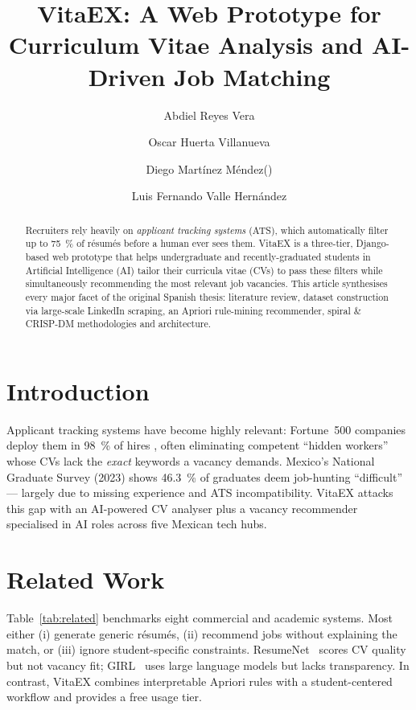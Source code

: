 \documentclass[runningheads]{llncs}
\title{VitaEX: A Web Prototype for Curriculum Vitae Analysis and AI-Driven Job Matching}
\author{
	Abdiel Reyes Vera\inst{1,2} \and
	Oscar Huerta Villanueva\inst{1} \and
	Diego Martínez Méndez\inst{1}(\Letter) \and 
	Luis Fernando Valle Hernández\inst{1} 
}
\institute{
	Escuela Superior de Cómputo, IPN, Mexico City, Mexico \\
	\texttt{\Letter~dmartinezm1707@alumno.ipn.mx} %
	\and
	Centro de Investigación en Computación, IPN, Mexico City, Mexico
}
\begin{document}
	\maketitle
	
	\begin{abstract}
		Recruiters rely heavily on \emph{applicant tracking systems} (ATS), which automatically filter up to 75~\% of résumés before a human ever sees them. VitaEX is a three-tier, Django-based web prototype that helps undergraduate and recently-graduated students in Artificial Intelligence (AI) tailor their curricula vitae (CVs) to pass these filters while simultaneously recommending the most relevant job vacancies. This article synthesises every major facet of the original Spanish thesis: literature review, dataset construction via large-scale LinkedIn scraping, an Apriori rule-mining recommender, spiral \& CRISP-DM methodologies and architecture.
		
		
		 
	\end{abstract}
	

	
	\section{Introduction}
	Applicant tracking systems have become highly relevant: Fortune~500 companies deploy them in 98~\% of hires \cite{ats1}, often eliminating competent “hidden workers” whose CVs lack the \emph{exact} keywords a vacancy demands. Mexico’s National Graduate Survey (2023) shows 46.3~\% \cite{uvm2023} of graduates deem job-hunting “difficult” — largely due to missing experience and ATS incompatibility. VitaEX attacks this gap with an AI-powered CV analyser plus a vacancy recommender specialised in AI roles across five Mexican tech hubs.
	
	\section{Related Work}
	Table~\ref{tab:related} benchmarks eight commercial and academic systems. Most either (i) generate generic résumés, (ii) recommend jobs without explaining the match, or (iii) ignore student-specific constraints. ResumeNet~\cite{resumenet} scores CV quality but not vacancy fit; GIRL~\cite{girl} uses large language models but lacks transparency. In contrast, VitaEX combines interpretable Apriori rules with a student-centered workflow and provides a free usage tier.
	
\end{document}

